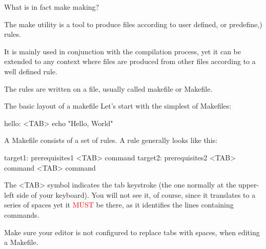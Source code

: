 \documentclass[10pt,aspectratio=169]{beamer}
\newcommand{\blue}{\color{blue}}
\begin{document}
\begin{frame}{What is in fact make making?}

  The \alert{make} utility is a tool to produce files according to user
  defined, or predefine,) rules.  \medskip

  It is mainly used in conjunction with the \alert{compilation process},
  yet it can be extended to any context where files are produced from
  other files according to a well defined rule.  \medskip

  The rules are written on a file, usually called {\blue makefile} or
  {\blue Makefile}.  
\end{frame}

\begin{frame}{The basic layout of a makefile}
Let's start with the simplest of Makefiles:
\begin{semiverbatim}
hello:\newline
\alert{<TAB>} echo "Hello, World"
\end{semiverbatim}

A Makefile consists of a set of rules. A rule generally looks like this:
\begin{semiverbatim}
\alert{target1}: {\blue prerequisites1}\newline
\alert{<TAB>} command\newline
\alert{target2}: {\blue prerequisites2}\newline
\alert{<TAB>} command\newline
\alert{<TAB>} command\newline
\end{semiverbatim}
\vspace*{-0.5cm}
The \alert{<TAB>} symbol indicates the \alert{tab keystroke} (the one
normally at the upper-left side of your keyboard). You will not see
it, of course, since it translates to a series of spaces
yet it \textcolor{red}{MUST} be there, as it identifies the lines containing {\blue commands}.
\smallskip

\alert{Make sure your editor is not configured to replace tabs with spaces, when editing a Makefile}.

\end{frame}
\end{document}

